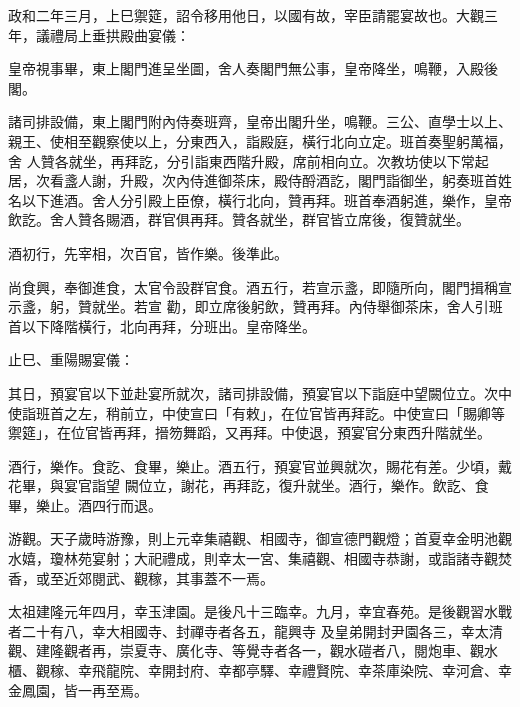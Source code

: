 \begin{pinyinscope}
 政和二年三月，上巳禦筵，詔令移用他日，以國有故，宰臣請罷宴故也。大觀三年，議禮局上垂拱殿曲宴儀：



 皇帝視事畢，東上閣門進呈坐圖，舍人奏閣門無公事，皇帝降坐，鳴鞭，入殿後閣。



 諸司排設備，東上閣門附內侍奏班齊，皇帝出閣升坐，鳴鞭。三公、直學士以上、親王、使相至觀察使以上，分東西入，詣殿庭，橫行北向立定。班首奏聖躬萬福，舍
 人贊各就坐，再拜訖，分引詣東西階升殿，席前相向立。次教坊使以下常起居，次看盞人謝，升殿，次內侍進御茶床，殿侍酹酒訖，閣門詣御坐，躬奏班首姓名以下進酒。舍人分引殿上臣僚，橫行北向，贊再拜。班首奉酒躬進，樂作，皇帝飲訖。舍人贊各賜酒，群官俱再拜。贊各就坐，群官皆立席後，復贊就坐。



 酒初行，先宰相，次百官，皆作樂。後準此。



 尚食興，奉御進食，太官令設群官食。酒五行，若宣示盞，即隨所向，閣門揖稱宣示盞，躬，贊就坐。若宣
 勸，即立席後躬飲，贊再拜。內侍舉御茶床，舍人引班首以下降階橫行，北向再拜，分班出。皇帝降坐。



 止巳、重陽賜宴儀：



 其日，預宴官以下並赴宴所就次，諸司排設備，預宴官以下詣庭中望闕位立。次中使詣班首之左，稍前立，中使宣曰「有敕」，在位官皆再拜訖。中使宣曰「賜卿等禦筵」，在位官皆再拜，搢笏舞蹈，又再拜。中使退，預宴官分東西升階就坐。



 酒行，樂作。食訖、食畢，樂止。酒五行，預宴官並興就次，賜花有差。少頃，戴花畢，與宴官詣望
 闕位立，謝花，再拜訖，復升就坐。酒行，樂作。飲訖、食畢，樂止。酒四行而退。



 游觀。天子歲時游豫，則上元幸集禧觀、相國寺，御宣德門觀燈；首夏幸金明池觀水嬉，瓊林苑宴射；大祀禮成，則幸太一宮、集禧觀、相國寺恭謝，或詣諸寺觀焚香，或至近郊閱武、觀稼，其事蓋不一焉。



 太祖建隆元年四月，幸玉津園。是後凡十三臨幸。九月，幸宜春苑。是後觀習水戰者二十有八，幸大相國寺、封禪寺者各五，龍興寺
 及皇弟開封尹園各三，幸太清觀、建隆觀者再，崇夏寺、廣化寺、等覺寺者各一，觀水磑者八，閱炮車、觀水櫃、觀稼、幸飛龍院、幸開封府、幸都亭驛、幸禮賢院、幸茶庫染院、幸河倉、幸金鳳園，皆一再至焉。




\end{pinyinscope}
